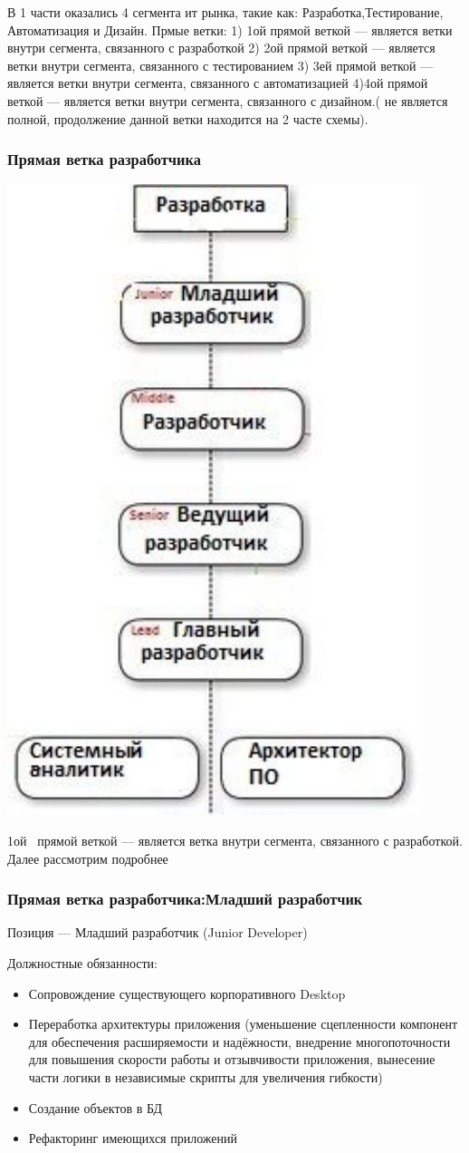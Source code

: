 \documentclass{../industrial-development}
\begin{document}
\lecturenotes
В 1 части оказались 4 сегмента ит рынка, такие как: Разработка,Тестирование, Автоматизация и Дизайн.
Прмые ветки:
1) 1ой прямой веткой --- является ветки внутри сегмента, связанного с разработкой
2) 2ой прямой веткой  --- является ветки внутри сегмента, связанного с тестированием
3) 3ей прямой веткой --- является ветки внутри сегмента, связанного с автоматизацией
4)4ой прямой веткой --- является ветки внутри сегмента, связанного с дизайном.( не является полной, продолжение данной ветки находится на 2 часте схемы).

\begin{frame} \frametitle{Прямая ветка разработчика}
 \centerline{\includegraphics[width=0.46\linewidth]{11-IT-specialist's-way/sch11a.pdf}}
\end{frame}

\lecturenotes
 1ой~\cite{mc} прямой веткой --- является ветка внутри сегмента, связанного с разработкой. Далее рассмотрим подробнее

\begin{frame} \frametitle{Прямая ветка разработчика:Младший разработчик}
 \begin{block}{}
  \alert{Позиция --- Младший разработчик (Junior Developer)}

Должностные обязанности: 
  \end{block}
  \begin{itemize}
  \item Сопровождение существующего корпоративного Desktop
  \item Переработка архитектуры приложения (уменьшение сцепленности компонент для обеспечения расширяемости и надёжности, внедрение многопоточности для повышения скорости работы и отзывчивости приложения, вынесение части логики в независимые скрипты для увеличения гибкости)
  \item Создание объектов в БД
 \item Рефакторинг имеющихся приложений
  \end{itemize}
\end{frame}
\end{document}
